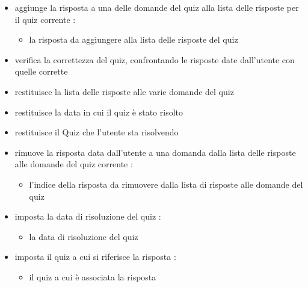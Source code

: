 \begin{itemize}
\item {}
\newline
aggiunge la risposta a una delle domande del quiz alla lista delle risposte per il quiz corrente
\newline
{} :
\begin{itemize}
\item {}
\newline
la risposta da aggiungere alla lista delle risposte del quiz
\end{itemize}
\item {}
\newline
verifica la correttezza del quiz, confrontando le risposte date dall'utente con quelle corrette
\newline
\item {}
\newline
restituisce la lista delle risposte alle varie domande del quiz
\newline
\item {}
\newline
restituisce la data in cui il quiz è stato risolto
\newline
\item {}
\newline
restituisce il Quiz che l'utente sta risolvendo
\newline
\item {}
\newline
rimuove la risposta data dall'utente a una domanda dalla lista delle risposte alle domande del quiz corrente
\newline
{} :
\begin{itemize}
\item {}
\newline
l'indice della risposta da rimuovere dalla lista di risposte alle domande del quiz
\end{itemize}
\item {}
\newline
imposta la data di risoluzione del quiz
\newline
{} :
\begin{itemize}
\item {}
\newline
la data di risoluzione del quiz
\end{itemize}
\item {}
\newline
imposta il quiz a cui si riferisce la risposta
\newline
{} :
\begin{itemize}
\item {}
\newline
il quiz a cui è associata la risposta
\end{itemize}
\end{itemize}
